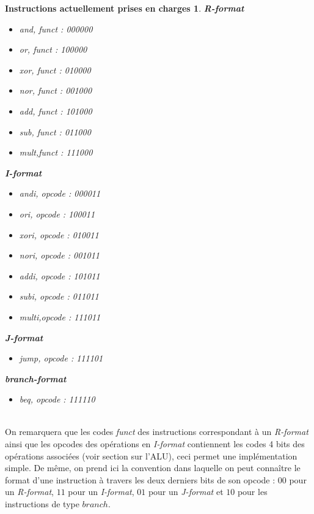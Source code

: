 \documentclass[13pt]{article}
\newtheorem{instr}
{ \textbf{Instructions actuellement prises en charges} }
\begin{document}
\begin{instr}

\textbf{R-format}
\begin{itemize}
  \item and, funct : 000000
  \item or,  funct : 100000
  \item xor, funct : 010000 
  \item nor, funct : 001000
  \item add, funct : 101000
  \item sub, funct : 011000
  \item mult,funct : 111000
\end{itemize}

\textbf{I-format}
\begin{itemize}
  \item andi, opcode : 000011
  \item ori,  opcode : 100011
  \item xori, opcode : 010011 
  \item nori, opcode : 001011
  \item addi, opcode : 101011
  \item subi, opcode : 011011
  \item multi,opcode : 111011
\end{itemize}

\textbf{J-format}
\begin{itemize}
  \item jump, opcode : 111101
\end{itemize}

\textbf{branch-format}
\begin{itemize}
  \item beq, opcode : 111110
\end{itemize}

\end{instr}

\textit{}\\

On remarquera que les codes \textit{funct} des instructions
correspondant à un \textit{R-format} ainsi que les opcodes
des opérations en \textit{I-format} contiennent les codes
4 bits des opérations associées (voir section sur l'ALU),
ceci permet une implémentation simple. De même, 
on prend ici la convention dans laquelle on peut connaître
le format d'une instruction à travers les deux derniers bits
de son opcode : $00$ pour un \textit{R-format}, $11$ pour un 
\textit{I-format}, $01$ pour un \textit{J-format} et $10$ pour 
les instructions de type $branch$.\\
\end{document}
